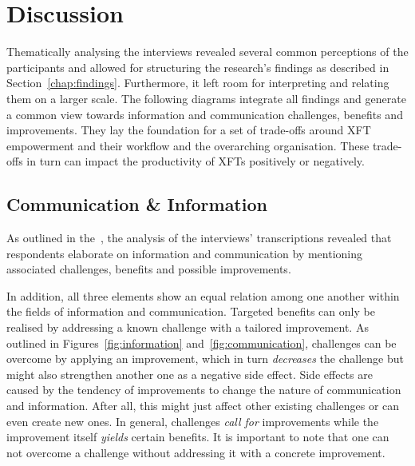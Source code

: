 \chapter{Discussion}
\label{chap:discussion}

Thematically analysing the interviews revealed several common perceptions of the participants and allowed for structuring the research's findings as described in Section~\ref{chap:findings}. Furthermore, it left room for interpreting and relating them on a larger scale. The following diagrams integrate all findings and generate a common view towards information and communication challenges, benefits and improvements. They lay the foundation for a set of trade-offs around \ac{XFT} empowerment and their workflow and the overarching organisation. These trade-offs in turn can impact the productivity of \acp{XFT} positively or negatively.

\section{Communication \& Information}

As outlined in the~, the analysis of the interviews' transcriptions revealed that respondents elaborate on information and communication by mentioning associated challenges, benefits and possible improvements.

In addition, all three elements show an equal relation among one another within the fields of information and communication. Targeted benefits can only be realised by addressing a known challenge with a tailored improvement. As outlined in Figures~\ref{fig:information} and~\ref{fig:communication}, challenges can be overcome by applying an improvement, which in turn \emph{decreases} the challenge but might also strengthen another one as a negative side effect. Side effects are caused by the tendency of improvements to change the nature of communication and information. After all, this might just affect other existing challenges or can even create new ones.
In general, challenges \emph{call for} improvements while the improvement itself \emph{yields} certain benefits. It is important to note that one can not overcome a challenge without addressing it with a concrete improvement.

